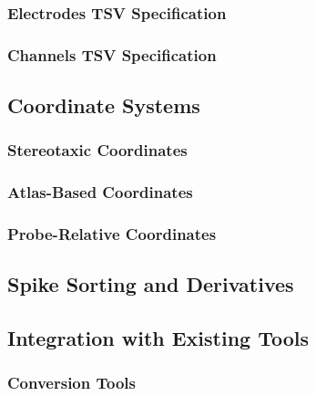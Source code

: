 \documentclass[fleqn,10pt]{wlscirep}
\begin{document}
\subsubsection*{Electrodes TSV Specification}

\subsubsection*{Channels TSV Specification}

\subsection*{Coordinate Systems}

\subsubsection*{Stereotaxic Coordinates}

\subsubsection*{Atlas-Based Coordinates}

\subsubsection*{Probe-Relative Coordinates}

\subsection*{Spike Sorting and Derivatives}

\subsection*{Integration with Existing Tools}

\subsubsection*{Conversion Tools}
\end{document}
